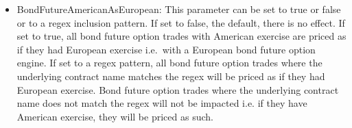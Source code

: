 \begin{itemize}
  engines.
\item BondFutureAmericanAsEuropean: This parameter can be set to true or false or to a regex inclusion pattern.
  If set to false, the default, there is no effect.
  If set to true, all bond future option trades with American exercise are priced as if they had European exercise 
  i.e.\ with a European bond future option engine.
  If set to a regex pattern, all bond future option trades where the underlying contract name matches the regex 
  will be priced as if they had European exercise. Bond future option trades where the underlying contract name 
  does not match the regex will not be impacted i.e. if they have American exercise, they will be priced as such.
\end{itemize}
